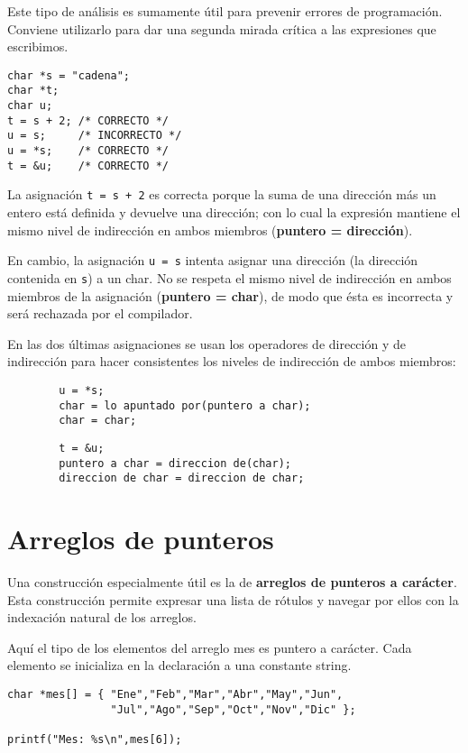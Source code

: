 \begin{ejemplo}
Este tipo de análisis es sumamente útil para prevenir errores de programación.
Conviene utilizarlo para dar una segunda mirada crítica a las expresiones que
escribimos.

\begin{lstlisting}
char *s = "cadena";
char *t;
char u;
t = s + 2; /* CORRECTO */
u = s;     /* INCORRECTO */
u = *s;    /* CORRECTO */
t = &u;    /* CORRECTO */	
\end{lstlisting}

La asignación \lstinline{t = s + 2} es correcta porque la suma de una dirección más un
entero está definida y devuelve una dirección; con lo cual la expresión
mantiene el mismo nivel de indirección en ambos miembros (\textbf{puntero = dirección}).

En cambio, la asignación \lstinline{u = s} intenta asignar una dirección (la dirección contenida en \lstinline{s}) a un
char. No se respeta el mismo nivel de indirección en ambos miembros de la
asignación (\textbf{puntero = char}), de modo que ésta es incorrecta y será rechazada por el compilador.

En las dos últimas asignaciones se usan los operadores de dirección y de
indirección para hacer consistentes los niveles de indirección de ambos
miembros:
\begin{lstlisting}
		u = *s;
		char = lo apuntado por(puntero a char);
		char = char;
\end{lstlisting}

\begin{lstlisting}
		t = &u;
		puntero a char = direccion de(char);
		direccion de char = direccion de char;
\end{lstlisting}

\end{ejemplo}

\section{Arreglos de punteros}
Una construcción especialmente útil es la de \textbf{arreglos de punteros a carácter}.
Esta construcción permite expresar una lista de rótulos y navegar por ellos con
la indexación natural de los arreglos.

\begin{ejemplo}
Aquí el tipo de los elementos del arreglo mes es puntero a carácter. Cada
elemento se inicializa en la declaración a una constante string.

\begin{lstlisting}
char *mes[] = { "Ene","Feb","Mar","Abr","May","Jun",
                "Jul","Ago","Sep","Oct","Nov","Dic" };

printf("Mes: %s\n",mes[6]);
\end{lstlisting}


\end{ejemplo}


